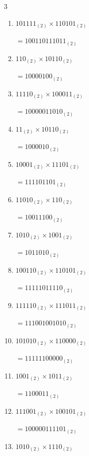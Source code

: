 \begin{multicols}{3}
\begin{enumerate}
        $=1110000_{(2)}$

  \item $101111_{(2)} \times 110101_{(2)}$

        $=100110111011_{(2)}$

\columnbreak %

  \item $110_{(2)} \times 10110_{(2)}$

        $=10000100_{(2)}$

  \item $11110_{(2)} \times 100011_{(2)}$

        $=10000011010_{(2)}$

  \item $11_{(2)} \times 10110_{(2)}$

        $=1000010_{(2)}$

  \item $10001_{(2)} \times 11101_{(2)}$

        $=111101101_{(2)}$

  \item $11010_{(2)} \times 110_{(2)}$

        $=10011100_{(2)}$

\columnbreak %

  \item $1010_{(2)} \times 1001_{(2)}$

        $=1011010_{(2)}$

  \item $100110_{(2)} \times 110101_{(2)}$

        $=11111011110_{(2)}$

  \item $111110_{(2)} \times 111011_{(2)}$

        $=111001001010_{(2)}$

  \item $101010_{(2)} \times 110000_{(2)}$

        $=11111100000_{(2)}$

  \item $1001_{(2)} \times 1011_{(2)}$

        $=1100011_{(2)}$

\columnbreak %

\resetques

  \item $111001_{(2)} \times 100101_{(2)}$

        $=100000111101_{(2)}$

  \item $1010_{(2)} \times 1110_{(2)}$


\end{enumerate}
\end{multicols}
